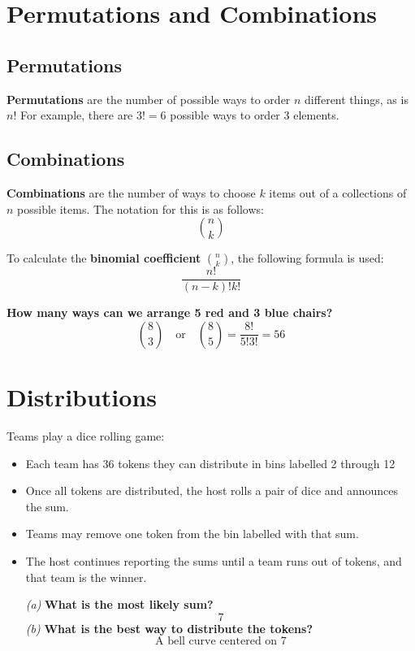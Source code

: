 \documentclass[titlepage, 12pt, leqno]{article}
\begin{document}
\section{Permutations and Combinations}
\subsection{Permutations}
\begin{definition}
    \textbf{Permutations} are the number of possible ways to order $n$ different things, as is $n!$ For example, there are $3! = 6$ possible ways to order 3 elements.
\end{definition}

\subsection{Combinations}
\begin{definition}
    \textbf{Combinations} are the number of ways to choose $k$ items out of a collections of $n$ possible items. The notation for this is as follows:
    \[
        \binom{n}{k}
    \]
\end{definition}
To calculate the \textbf{binomial coefficient} $\binom{n}{k}$, the following formula is used:
\[
    \frac{n!}{(n-k)! k!}
\]
\begin{ex}
    \textbf{How many ways can we arrange 5 red and 3 blue chairs?} 
    \[
      \binom{8}{3} \quad \text{or} \quad \binom{8}{5} = \frac{8!}{5!3!} = \boxed{56} 
    \]
\end{ex}
\pagebreak
\section{Distributions}
\begin{ex}
    Teams play a dice rolling game:
    \begin{itemize}
        \item Each team has 36 tokens they can distribute in bins labelled 2 through 12
        \item Once all tokens are distributed, the host rolls a pair of dice and announces the sum.
        \item Teams may remove one token from the bin labelled with that sum.
        \item The host continues reporting the sums until a team runs out of tokens, and that team is the winner.

        \textit{(a)} \textbf{What is the most likely sum?} 
        \[
        \boxed{7} 
        \]
        \textit{(b)} \textbf{What is the best way to distribute the tokens?} 
        \[
        \boxed{\text{A bell curve centered on 7}}
        \]
    \end{itemize}
\end{ex}
\end{document}
